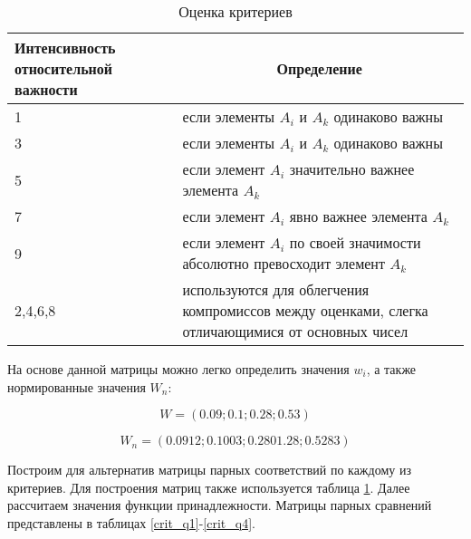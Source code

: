 \begin{table}[H]
  \caption{Оценка критериев}\label{crit_scale}
  \begin{tabular}{|p{4cm}|p{12cm}|}
  \hline Интенсивность относительной важности & \multicolumn{1}{|c|}{Определение} \\
  \hline 1 & если элементы $A_i$ и $A_k$ одинаково важны \\
  \hline 3 & если элементы $A_i$ и $A_k$ одинаково важны \\
  \hline 5 & если элемент $A_i$ значительно важнее элемента $A_k$ \\
  \hline 7 & если элемент $A_i$ явно важнее элемента $A_k$ \\
  \hline 9 & если элемент $A_i$ по своей значимости абсолютно превосходит элемент $A_k$ \\
  \hline 2,4,6,8 & используются для облегчения компромиссов между оценками, слегка отличающимися от основных чисел \\
  \hline
  \end{tabular}
\end{table}

На основе данной матрицы можно легко определить значения $w_i$, а также нормированные значения $W_n$:

\begin{equation}
    W=(0.09;0.1;0.28;0.53)
\end{equation}

\begin{equation}
    W_n=(0.0912;0.1003;0.2801.28;0.5283)
\end{equation}

Построим для альтернатив матрицы парных соответствий по каждому из критериев. 
Для построения матриц также используется таблица \ref{crit_scale}. 
Далее рассчитаем значения функции принадлежности.
Матрицы парных сравнений представлены в таблицах \ref{crit_q1}-\ref{crit_q4}.


